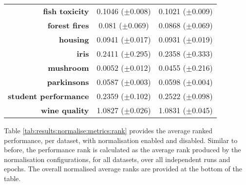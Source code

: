\begin{table}[htb]
{\begin{tabular}{r|cc}
                  \textbf{fish toxicity}       & \cellcolor[rgb]{ .973,  .412,  .42}0.1046 ($\pm$0.008)         & \cellcolor[rgb]{ .388,  .745,  .482}0.1021 ($\pm$0.009) \\
                  \textbf{forest fires}        & \cellcolor[rgb]{ .388,  .745,  .482}0.081 ($\pm$0.069)         & \cellcolor[rgb]{ .973,  .412,  .42}0.0868 ($\pm$0.069)  \\
                  \textbf{housing}             & \cellcolor[rgb]{ .973,  .412,  .42}0.0941 ($\pm$0.017)         & \cellcolor[rgb]{ .388,  .745,  .482}0.0931 ($\pm$0.019) \\
                  \textbf{iris}                & \cellcolor[rgb]{ .973,  .412,  .42}0.2411 ($\pm$0.295)         & \cellcolor[rgb]{ .388,  .745,  .482}0.2358 ($\pm$0.333) \\
                  \textbf{mushroom}            & \cellcolor[rgb]{ .388,  .745,  .482}0.0052 ($\pm$0.012)        & \cellcolor[rgb]{ .973,  .412,  .42}0.0455 ($\pm$0.216)  \\
                  \textbf{parkinsons}          & \cellcolor[rgb]{ .388,  .745,  .482}0.0587 ($\pm$0.003)        & \cellcolor[rgb]{ .973,  .412,  .42}0.0598 ($\pm$0.004)  \\
                  \textbf{student performance} & \cellcolor[rgb]{ .388,  .745,  .482}0.2359 ($\pm$0.102)        & \cellcolor[rgb]{ .973,  .412,  .42}0.2522 ($\pm$0.098)  \\
                  \textbf{wine quality}        & \cellcolor[rgb]{ .388,  .745,  .482}1.0827 ($\pm$0.026)        & \cellcolor[rgb]{ .973,  .412,  .42}1.0831 ($\pm$0.045)  \\
            \end{tabular}%
      }
\end{table}%


Table \ref{tab:results:normalise:metrics:rank} provides the average ranked performance, per dataset, with normalisation enabled and disabled. Similar to before, the performance rank is calculated as the average rank produced by the normalisation configurations, for all datasets, over all independent runs and epochs. The overall normalised average ranks are provided at the bottom of the table.


